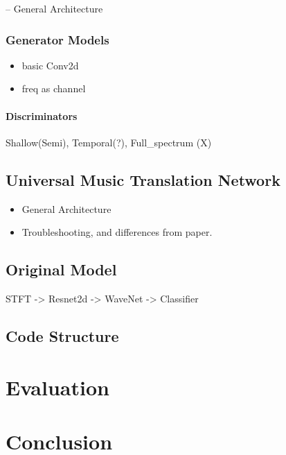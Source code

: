 \documentclass[]{article}
\providecommand{\tightlist}{%
  \setlength{\itemsep}{0pt}\setlength{\parskip}{0pt}}
\begin{document}
-- General Architecture

\hypertarget{generator-models}{%
\subsubsection{Generator Models}\label{generator-models}}

\begin{itemize}
\tightlist
\item
  basic Conv2d
\item
  freq as channel
\end{itemize}

\paragraph{Discriminators}

Shallow(Semi), Temporal(?), Full\_spectrum (X)

\hypertarget{universal-music-translation-network-1}{%
\subsection{Universal Music Translation
Network}\label{universal-music-translation-network-1}}

\begin{itemize}
\item
  General Architecture
\item
  Troubleshooting, and differences from paper.
\end{itemize}

\hypertarget{original-model}{%
\subsection{Original Model}\label{original-model}}

STFT -\textgreater{} Resnet2d -\textgreater{} WaveNet -\textgreater{}
Classifier

\hypertarget{code-structure}{%
\subsection{Code Structure}\label{code-structure}}

\hypertarget{evaluation}{%
\section{Evaluation}\label{evaluation}}

\hypertarget{conclusion}{%
\section{Conclusion}\label{conclusion}}
\end{document}
